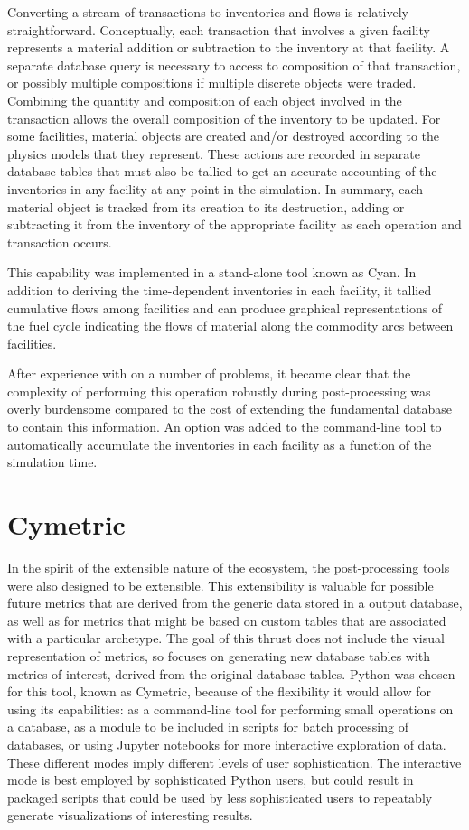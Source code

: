 Converting a stream of transactions to inventories and flows is relatively
straightforward.  Conceptually, each transaction that involves a given
facility represents a material addition or subtraction to the inventory at
that facility.  A separate database query is necessary to access to
composition of that transaction, or possibly multiple compositions if multiple
discrete objects were traded.  Combining the quantity and composition of each
object involved in the transaction allows the overall composition of the
inventory to be updated.  For some facilities, material objects are created
and/or destroyed according to the physics models that they represent.  These
actions are recorded in separate database tables that must also be tallied to
get an accurate accounting of the inventories in any facility at any point in
the simulation. In summary, each material object is tracked from its creation
to its destruction, adding or subtracting it from the inventory of the
appropriate facility as each operation and transaction occurs.

This capability was implemented in a stand-alone tool known as Cyan.  In
addition to deriving the time-dependent inventories in each facility, it
tallied cumulative flows among facilities and can produce graphical
representations of the fuel cycle indicating the flows of material along the
commodity arcs between facilities.

After experience with \Cyclus on a number of problems, it became clear that
the complexity of performing this operation robustly during post-processing
was overly burdensome compared to the cost of extending the fundamental
\Cyclus database to contain this information.  An option was added to the
\Cyclus command-line tool to automatically accumulate the inventories in each
facility as a function of the simulation time.

\section{Cymetric}

In the spirit of the extensible nature of the \Cyclus ecosystem, the
post-processing tools were also designed to be extensible.  This extensibility
is valuable for possible future metrics that are derived from the generic data
stored in a \Cyclus output database, as well as for metrics that might be
based on custom tables that are associated with a particular archetype.  The
goal of this thrust does not include the visual representation of metrics, so
focuses on generating new database tables with metrics of interest, derived
from the original database tables.  Python was chosen for this tool, known as
Cymetric, because of the flexibility it would allow for using its
capabilities: as a command-line tool for performing small operations on a
database, as a module to be included in scripts for batch processing of
databases, or using Jupyter notebooks for more interactive
exploration of data.  These different modes imply different levels of user
sophistication.  The interactive mode is best employed by sophisticated Python
users, but could result in packaged scripts that could be used by less
sophisticated users to repeatably generate visualizations of interesting
results.

